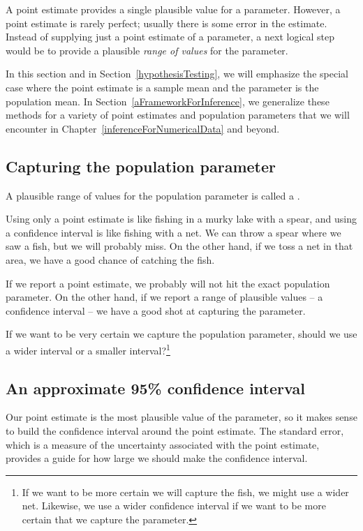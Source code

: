 A point estimate provides a single plausible value for a parameter. However, a point estimate is rarely perfect; usually there is some error in the estimate. Instead of supplying just a point estimate of a parameter, a next logical step would be to provide a plausible \emph{range of values} for the parameter.

In this section and in Section~\ref{hypothesisTesting}, we will emphasize the special case where the point estimate is a sample mean and the parameter is the population mean. In Section~\ref{aFrameworkForInference}, we generalize these methods for a variety of point estimates and population parameters that we will encounter in Chapter~\ref{inferenceForNumericalData} and beyond.

\subsection{Capturing the population parameter}

A plausible range of values for the population parameter is called a .

Using only a point estimate is like fishing in a murky lake with a spear, and using a confidence interval is like fishing with a net. We can throw a spear where we saw a fish, but we will probably miss. On the other hand, if we toss a net in that area, we have a good chance of catching the fish.

If we report a point estimate, we probably will not hit the exact population parameter. On the other hand, if we report a range of plausible values -- a confidence interval -- we have a good shot at capturing the parameter. 

\begin{exercise}
If we want to be very certain we capture the population parameter, should we use a wider interval or a smaller interval?\footnote{If we want to be more certain we will capture the fish, we might use a wider net. Likewise, we use a wider confidence interval if we want to be more certain that we capture the parameter.}
\end{exercise}

\subsection{An approximate 95\% confidence interval}

Our point estimate is the most plausible value of the parameter, so it makes sense to build the confidence interval around the point estimate. The standard error, which is a measure of the uncertainty associated with the point estimate, provides a guide for how large we should make the confidence interval.

